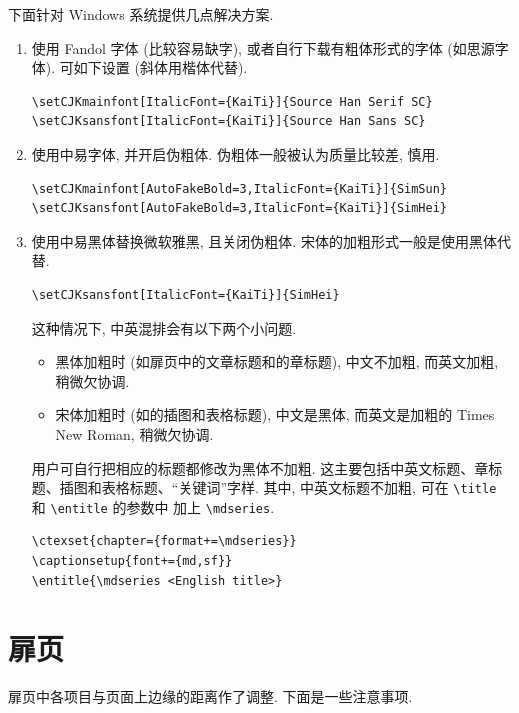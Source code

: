 下面针对 Windows 系统提供几点解决方案.

\begin{enumerate}
  \item
    使用 Fandol 字体 (比较容易缺字), 或者自行下载有粗体形式的字体
    (如思源字体). 可如下设置 (斜体用楷体代替).
\begin{verbatim}
\setCJKmainfont[ItalicFont={KaiTi}]{Source Han Serif SC}
\setCJKsansfont[ItalicFont={KaiTi}]{Source Han Sans SC}
\end{verbatim}
  \item
    使用中易字体, 并开启伪粗体. 伪粗体一般被认为质量比较差, 慎用.
\begin{verbatim}
\setCJKmainfont[AutoFakeBold=3,ItalicFont={KaiTi}]{SimSun}
\setCJKsansfont[AutoFakeBold=3,ItalicFont={KaiTi}]{SimHei}
\end{verbatim}
  \item
    使用中易黑体替换微软雅黑, 且关闭伪粗体.
    宋体的加粗形式一般是使用黑体代替.
\begin{verbatim}
\setCJKsansfont[ItalicFont={KaiTi}]{SimHei}
\end{verbatim}
    这种情况下, 中英混排会有以下两个小问题.
    \begin{itemize}
      \item
        黑体加粗时 (如扉页中的文章标题和的章标题),
        中文不加粗, 而英文加粗, 稍微欠协调.
      \item
        宋体加粗时 (如的插图和表格标题),
        中文是黑体, 而英文是加粗的 Times New Roman, 稍微欠协调.
    \end{itemize}
    用户可自行把相应的标题都修改为黑体不加粗.
    这主要包括中英文标题、章标题、插图和表格标题、“关键词”字样.
    其中, 中英文标题不加粗, 可在 \verb|\title| 和 \verb|\entitle| 的参数中
    加上 \verb|\mdseries|.
\begin{verbatim}
\ctexset{chapter={format+=\mdseries}}
\captionsetup{font+={md,sf}}
\entitle{\mdseries <English title>}
\end{verbatim}
\end{enumerate}

\section{扉页}

扉页中各项目与页面上边缘的距离作了调整.
下面是一些注意事项.

